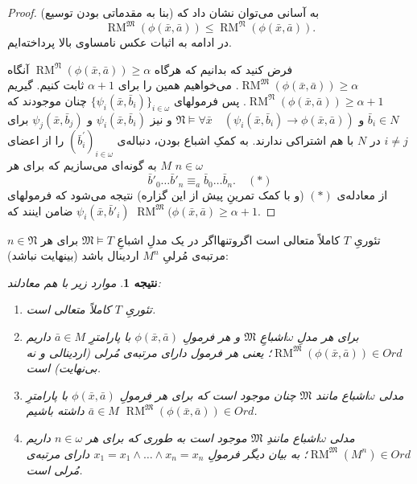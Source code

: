 \documentclass[12pt,a4paper]{report}
\theoremstyle{colorhead}
\newtheorem{cor}[thm]{نتیجه}
\DeclareMathOperator{\RM}{RM}
\begin{document}
\begin{proof}
به آسانی می‌توان نشان داد که (بنا به مقدماتی بودن توسیع)
\[
\RM^\mathfrak{M}(\phi(\bar{x},\bar{a}))\leq \RM^\mathfrak{N}(\phi(\bar{x},\bar{a})).
\]
در ادامه به اثبات عکس نامساوی بالا پرداخته‌ایم. 
\par 
فرض کنید که بدانیم که هرگاه
$\RM^\mathfrak{N}(\phi(\bar{x},\bar{a}))\geq \alpha$
آنگاه 
$\RM^\mathfrak{M}(\phi(\bar{x},\bar{a}))\geq \alpha$.
می‌خواهیم همین را برای
$\alpha+1$
ثابت کنیم.  گیریم
$\RM^\mathfrak{N}(\phi(\bar{x},\bar{a}))\geq \alpha+1$.
پس فرمولهای
$\{\psi_i(\bar{x},\bar{b}_i)\}_{i\in \omega}$
چنان موجودند که 
$\bar{b}_i\in N$
و
$\mathfrak{N}\models \forall \bar{x} \quad (\psi_i(\bar{x},\bar{b}_i)\to \phi(\bar{x},\bar{a}))$
و نیز
$\psi_i(\bar{x},\bar{b}_i)$
و
$\psi_j(\bar{x},\bar{b}_j)$
برای 
$i\not=j$
در
$N$
با هم اشتراکی ندارند.   
به کمکِ اشباع بودن،
دنباله‌ی
$(\bar{b}^\prime _i)_{i\in \omega}$
را از اعضای
$M$
به گونه‌ای می‌سازیم که برای هر
$n\in \omega$
\[
\bar{b}'_0\ldots\bar{b}'_n\equiv_a \bar{b}_0\ldots\bar{b}_n. \quad(*)
\]
از معادله‌ی
$(*)$
(و با کمک تمرینِ پیش از این گزاره)
نتیجه می‌شود که
فرمولهای
$\psi_i(\bar{x},\bar{b}'_i)$
ضامن اینند که
$\RM^\mathfrak{M}(\phi(\bar{x},\bar{a})\geq \alpha+1$.
\end{proof}
تئوریِ 
$T$
کاملاً متعالی است اگروتنهااگر در یک مدلِ اشباعِ
$\mathfrak{M}\models T$
برای
هر
$n\in \mathfrak{N}$
مرتبه‌ی مُرلیِ
$M^n$
اردینال باشد (بینهایت نباشد):
\begin{cor}
	موارد زیر با هم معادلند:
	\begin{enumerate}
		\item 
		تئوریِ
		$T$
		کاملاً متعالی است.
		\item 
		برای هر مدلِ
		$\omega$اشباعِ
		$\mathfrak{M}$
		و هر فرمولِ
		$\phi(\bar{x},\bar{a})$
		با پارامترِ
		$\bar{a}\in M$
		داریم
		\mbox{$\RM^\mathfrak{M}(\phi(\bar{x},\bar{a}))\in Ord$}؛
		یعنی هر فرمول دارای مرتبه‌ی مُرلی (اردینالی و نه بی‌نهایت) است. 
		\item 
		مدلی
		$\omega$اشباع
		 مانند
		$\mathfrak{M}$
		 چنان موجود است که 
برای
		 هر فرمولِ
		 $\phi(\bar{x},\bar{a})$
		 با پارامترِ
		 $\bar{a}\in M$
داشته باشیم
		 $\RM^\mathfrak{M}(\phi(\bar{x},\bar{a}))\in Ord$.
		 \item 
		 مدلی 
		 $\omega
		 $اشباع 
		 مانندِ
		 $\mathfrak{M}$
		 موجود است به طوری که برای هر
		 $n\in \omega$
		 داریم
		 \mbox{$\RM^\mathfrak{M}(M^n)\in Ord$؛}
		 به بیان دیگر 
		 فرمولِ
		 $x_1=x_1\wedge\ldots\wedge x_n=x_n$
		 دارای مرتبه‌ی مُرلی است. 
	\end{enumerate}
	\end{cor}
\end{document}
